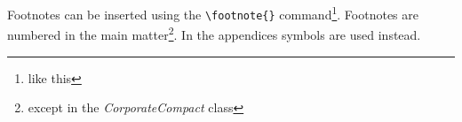 Footnotes can be inserted using the \verb+\footnote{}+ command\footnote{like this}. Footnotes are numbered in the main matter\footnote{except in the \emph{CorporateCompact} class}. In the appendices symbols are used instead.
